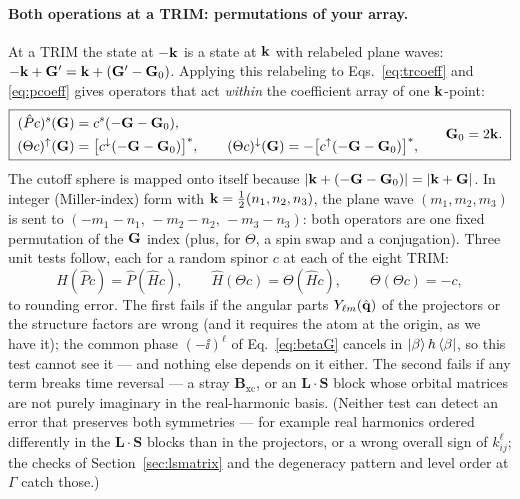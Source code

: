 \paragraph{Both operations at a TRIM: permutations of your array.} At a
TRIM the state at $-\mathbf{k}$ is a state at $\mathbf{k}$ with relabeled plane waves:
$-\mathbf{k}+\mathbf{G}' = \mathbf{k} + (\mathbf{G}'-\mathbf{G}_0)$. Applying this relabeling to
Eqs.~\eqref{eq:trcoeff} and \eqref{eq:pcoeff} gives operators that act
\emph{within} the coefficient array of one $\mathbf{k}$-point:
\begin{equation}
\boxed{\;
\begin{aligned}
(\hat P c)^{s}(\mathbf{G}) &= c^{s}(-\mathbf{G}-\mathbf{G}_0),\\
(\Theta c)^{\uparrow}(\mathbf{G}) &= \big[c^{\downarrow}(-\mathbf{G}-\mathbf{G}_0)\big]^*,\qquad
(\Theta c)^{\downarrow}(\mathbf{G}) = -\big[c^{\uparrow}(-\mathbf{G}-\mathbf{G}_0)\big]^*,
\end{aligned}
\qquad \mathbf{G}_0 = 2\mathbf{k} .\;}
\label{eq:parityperm}
\end{equation}
The cutoff sphere is mapped onto itself because
$|\mathbf{k} + (-\mathbf{G}-\mathbf{G}_0)| = |\mathbf{k}+\mathbf{G}|$. In integer (Miller-index) form with
$\mathbf{k} = \tfrac12(n_1,n_2,n_3)$, the plane wave $(m_1,m_2,m_3)$ is sent to
$(-m_1-n_1,\,-m_2-n_2,\,-m_3-n_3)$: both operators are one fixed
permutation of the $\mathbf{G}$ index (plus, for $\Theta$, a spin swap and a
conjugation). Three unit tests follow, each for a random spinor $c$ at
each of the eight TRIM:
\begin{equation}
\hat H(\hat P c) = \hat P(\hat H c),
\qquad
\hat H(\Theta c) = \Theta(\hat H c),
\qquad
\Theta(\Theta c) = -c ,
\end{equation}
to rounding error. The first fails if the angular parts $Y_{\ell m}(\hat{\mathbf{q}})$
of the projectors or the structure factors are wrong (and it requires the atom
at the origin, as we have it); the common phase $(-\ii)^\ell$ of
Eq.~\eqref{eq:betaG} cancels in $\ket{\beta}h\bra{\beta}$, so this test cannot see
it --- and nothing else depends on it either. The second fails if any
term breaks time reversal --- a stray $\mathbf B_{\mathrm{xc}}$, or an
$\mathbf L\cdot\mathbf S$ block whose orbital matrices are not purely
imaginary in the real-harmonic basis. (Neither test can detect an error that preserves both symmetries --- for
example real harmonics ordered differently in the $\mathbf L\cdot\mathbf S$
blocks than in the projectors, or a wrong overall sign of $k^\ell_{ij}$; the
checks of Section~\ref{sec:lsmatrix} and the degeneracy pattern and level order
at $\Gamma$ catch those.)

